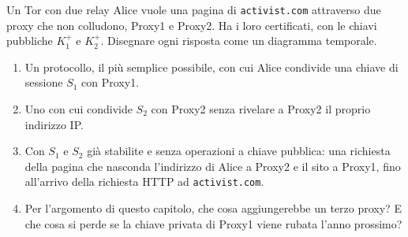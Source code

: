 \begin{esercizio}{Un Tor con due relay}
Alice vuole una pagina di \texttt{activist.com} attraverso due proxy che non colludono, Proxy1 e Proxy2. Ha i loro certificati, con le
chiavi pubbliche $K_1^+$ e $K_2^+$. Disegnare ogni risposta come un diagramma temporale.
\begin{enumerate}[label=(\alph*)]
    \item Un protocollo, il più semplice possibile, con cui Alice condivide una chiave di sessione $S_1$ con Proxy1.
    \item Uno con cui condivide $S_2$ con Proxy2 senza rivelare a Proxy2 il proprio indirizzo IP.
    \item Con $S_1$ e $S_2$ già stabilite e senza operazioni a chiave pubblica: una richiesta della pagina che nasconda l'indirizzo di Alice a
          Proxy2 e il sito a Proxy1, fino all'arrivo della richiesta HTTP ad \texttt{activist.com}.
    \item Per l'argomento di questo capitolo, che cosa aggiungerebbe un terzo proxy? E che cosa si perde se la chiave privata di Proxy1 viene
          rubata l'anno prossimo?
\end{enumerate}


\end{esercizio}
